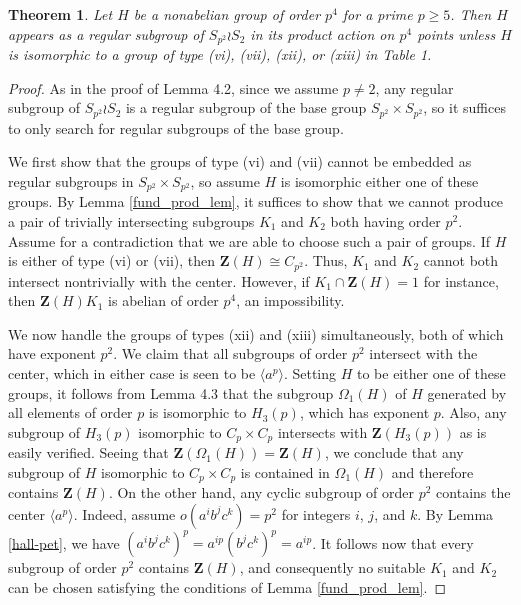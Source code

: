 \documentclass[12pt]{amsart}
\newtheorem{theorem}{Theorem}[section]
\theoremstyle{definition}
\newcommand{\la}{\langle}
\newcommand{\ra}{\rangle}
\newcommand{\Cent}{\mathbf{Z}}
\begin{document}
\begin{theorem}\label{main_thm_prod}
	Let $H$ be a nonabelian group of order $p^4$ for a prime $p \geq 5$. Then $H$ appears as a regular subgroup of $S_{p^2} \wr S_2$ in its product action on $p^4$ points unless $H$ is isomorphic to a group of type (vi), (vii), (xii), or (xiii) in Table 1.
\end{theorem}
\begin{proof}
	As in the proof of Lemma 4.2, since we assume $p \neq 2$, any regular subgroup of $S_{p^2} \wr S_2$ is a regular subgroup of the base group $S_{p^2} \times S_{p^2}$, so it suffices to only search for regular subgroups of the base group.
	
	We first show that the groups of type (vi) and (vii) cannot be embedded as regular subgroups in $S_{p^2} \times S_{p^2}$, so assume $H$ is isomorphic either one of these groups. By Lemma \ref{fund_prod_lem}, it suffices to show that we cannot produce a pair of trivially intersecting subgroups $K_1$ and $K_2$ both having order $p^2$. Assume for a contradiction that we are able to choose such a pair of groups. If $H$ is either of type (vi) or (vii), then $\Cent(H) \cong C_{p^2}$. Thus, $K_1$ and $K_2$ cannot both intersect nontrivially with the center. However, if $K_1 \cap \Cent(H) = 1$ for instance, then $\Cent(H)K_1$ is abelian of order $p^4$, an impossibility.
	
	We now handle the groups of types (xii) and (xiii) simultaneously, both of which have exponent $p^2$. We claim that all subgroups of order $p^2$ intersect with the center, which in either case is seen to be $\la a^p \ra$. Setting $H$ to be either one of these groups, it follows from Lemma 4.3 that the subgroup $\Omega_1(H)$ of $H$ generated by all elements of order $p$ is isomorphic to $H_3(p)$, which has exponent $p$. Also, any subgroup of $H_3(p)$ isomorphic to $C_p \times C_p$ intersects with $\Cent(H_3(p))$ as is easily verified. Seeing that $\Cent(\Omega_1(H)) = \Cent(H)$, we conclude that any subgroup of $H$ isomorphic to $C_p \times C_p$ is contained in $\Omega_1(H)$ and therefore contains $\Cent(H)$. On the other hand, any cyclic subgroup of order $p^2$ contains the center $\la a^p \ra$. Indeed, assume $o(a^ib^jc^k) = p^2$ for integers $i$, $j$, and $k$. By Lemma \ref{hall-pet}, we have $(a^ib^jc^k)^p = a^{ip}(b^jc^k)^p = a^{ip}$. It follows now that every subgroup of order $p^2$ contains $\Cent(H)$, and consequently no suitable $K_1$ and $K_2$ can be chosen satisfying the conditions of Lemma \ref{fund_prod_lem}.
	

\end{proof}
\end{document}
